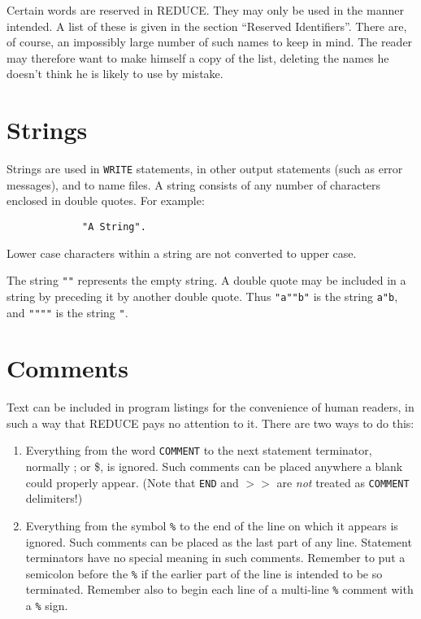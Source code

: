 \documentclass[11pt,letterpaper]{book}
\makeatletter
\newcommand{\REDUCE}{REDUCE}
\newcommand{\underscore}{\_}
\newcommand{\ttindex}[1]{{\renewcommand{\_}{\protect\underscore}%
                          \index{#1@{\tt #1}}}}
\makeatother
\begin{document}
Certain words are reserved in {\REDUCE}. They may only be used in the manner
intended. A list of these is given in the section ``Reserved Identifiers''.
There are, of course, an impossibly large number of such names to keep in
mind. The reader may therefore want to make himself a copy of the list,
deleting the names he doesn't think he is likely to use by mistake.

\section{Strings}

Strings are used in {\tt WRITE} statements, in other
output statements (such as error messages), and to name files.  A string
consists of any number of characters enclosed in double quotes.  For example:
{\small\begin{verbatim}
             "A String".
\end{verbatim}}
Lower case characters within a string are not converted to upper case.

The string {\tt ""} represents the empty string.  A double quote may be
included in a string by preceding it by another double quote.  Thus
{\tt "a""b"} is the string {\tt a"b}, and {\tt """"} is the string {\tt "}.

\section{Comments}

Text can be included in program listings for the
convenience of human readers, in such a way that {\REDUCE} pays no
attention to it.  There are two ways to do this:

\begin{enumerate}
\item Everything from the word {\tt COMMENT}\ttindex{COMMENT} to the next
statement terminator, normally ; or \$, is ignored.  Such comments
can be placed anywhere a blank could properly appear. (Note that {\tt END}
and $>>$ are {\em not\/} treated as {\tt COMMENT} delimiters!)

\item Everything from the symbol {\tt \%} to the end
of the line on which it appears is ignored.  Such comments can be placed
as the last part of any line.  Statement terminators have no special
meaning in such comments.  Remember to put a semicolon before the {\tt \%}
if the earlier part of the line is intended to be so terminated.  Remember
also to begin each line of a multi-line {\tt \%} comment with a {\tt \%}
sign.
\end{enumerate}
\end{document}
